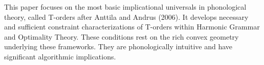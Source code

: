 This paper focuses on the most basic implicational universals in phonological theory, called T-orders after Anttila and Andrus (2006). It develops necessary and sufficient constraint characterizations of T-orders within Harmonic Grammar and Optimality Theory. These conditions rest on the rich convex geometry underlying these frameworks. They are phonologically intuitive and have significant algorithmic implications.
